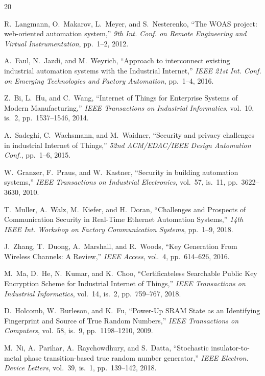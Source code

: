 \documentclass[a4paper,12pt]{article}
\begin{document}
\begin{thebibliography}{20}

 R.~Langmann, O.~Makarov, L.~Meyer, and S.~Nesterenko, ``The WOAS project: web-oriented automation system,'' \textit{9th Int. Conf. on Remote Engineering and Virtual Instrumentation}, pp.~1--2, 2012.

 A.~Faul, N.~Jazdi, and M.~Weyrich, ``Approach to interconnect existing industrial automation systems with the Industrial Internet,'' \textit{IEEE 21st Int. Conf. on Emerging Technologies and Factory Automation}, pp.~1--4, 2016.

 Z.~Bi, L.~Hu, and C.~Wang, ``Internet of Things for Enterprise Systems of Modern Manufacturing,'' \textit{IEEE Transactions on Industrial Informatics}, vol.~10, is.~2, pp.~1537--1546, 2014.

 A.~Sadeghi, C.~Wachsmann, and M.~Waidner, ``Security and privacy challenges in industrial Internet of Things,'' \textit{52nd ACM/EDAC/IEEE Design Automation Conf.}, pp.~1--6, 2015.

 W.~Granzer, F.~Praus, and W.~Kastner, ``Security in building automation systems,'' \textit{IEEE Transactions on Industrial Electronics}, vol.~57, is.~11, pp.~3622--3630, 2010.

 T.~Muller, A.~Walz, M.~Kiefer, and H.~Doran, ``Challenges and Prospects of Communication Security in Real-Time Ethernet Automation Systems,'' \textit{14th IEEE Int. Workshop on Factory Communication Systems}, pp.~1--9, 2018.

 J.~Zhang, T.~Duong, A.~Marshall, and R.~Woods, ``Key Generation From Wireless Channels: A Review,'' \textit{IEEE Access}, vol.~4, pp.~614--626, 2016.

 M.~Ma, D.~He, N.~Kumar, and K.~Choo, ``Certificateless Searchable Public Key Encryption Scheme for Industrial Internet of Things,'' \textit{IEEE Transactions on Industrial Informatics}, vol.~14, is.~2, pp.~759--767, 2018.

 D.~Holcomb, W.~Burleson, and K.~Fu, ``Power-Up SRAM State as an Identifying Fingerprint and Source of True Random Numbers,'' \textit{IEEE Transactions on Computers}, vol.~58, is.~9, pp.~1198--1210, 2009.

 M.~Ni, A.~Parihar, A.~Raychowdhury, and S.~Datta, ``Stochastic insulator-to-metal phase transition-based true random number generator,'' \textit{IEEE Electron. Device Letters}, vol.~39, is.~1, pp.~139--142, 2018.


\end{thebibliography}
\end{document}

